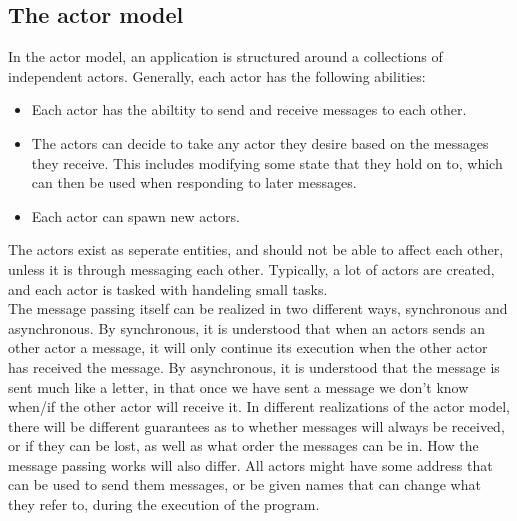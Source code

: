 \documentclass[a4paper]{article}
\begin{document}


\subsection{The actor model}
In the actor model, an application is structured around a collections of
independent actors. Generally, each actor has the following abilities:
\begin{itemize}
\item Each actor has the abiltity to send and receive messages to
  each other.
\item The actors can decide to take any actor they desire based on the
  messages they receive. This includes modifying some state that they hold on to,
  which can then be used when responding to later messages.
\item Each actor can spawn new actors.
\end{itemize}

The actors exist as seperate entities, and should not be able to affect each
other, unless it is through messaging each other. Typically, a lot of actors are
created, and each actor is tasked with handeling small tasks.\\

\noindent
The message passing itself can be realized in two different ways, synchronous
and asynchronous. By synchronous, it is understood that when an actors sends an
other actor a message, it will only continue its execution when the other actor
has received the message. By asynchronous, it is understood that the message is
sent much like a letter, in that once we have sent a message we don't know
when/if the other actor will receive it. In different realizations of the actor
model, there will be different guarantees as to whether messages will always be
received, or if they can be lost, as well as what order the messages can be
in. How the message passing works will also differ. All actors might have some
address that can be used to send them messages, or be given names that can
change what they refer to, during the execution of the program.
\end{document}
